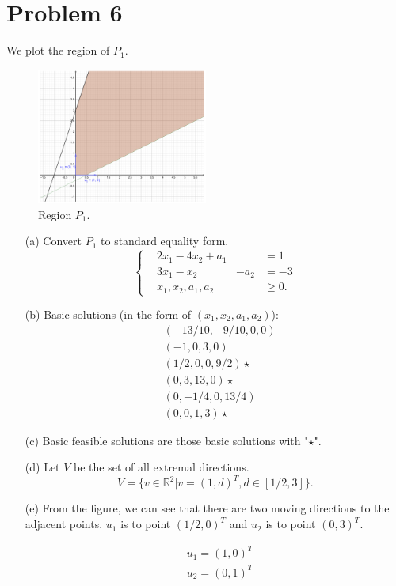 \documentclass[12pt]{article}
\begin{document}
\section*{Problem 6}
We plot the region of $P_1$.

\begin{figure}[htbp]
  \caption{Region $P_1$.}
  \centering
    \includegraphics[width=0.5\textwidth]{p6.pdf}
\end{figure}

\FloatBarrier

\begin{enumerate}
\item [(a)]
Convert $P_1$ to standard equality form.
$$
\left\{
\begin{aligned}
& 2x_1 - 4x_2 + a_1 & & = 1 \\
& 3x_1 - x_2   & -a_2 & = -3 \\
& x_1, x_2, a_1, a_2 & & \geqslant 0.
\end{aligned}
\right.
$$

\item[(b)]
Basic solutions (in the form of $(x_1, x_2, a_1, a_2)$): 
$$
\begin{aligned}
&(-13/10, -9/10, 0, 0)   \\ 
&(-1, 0, 3, 0)\\ 
&(1/2, 0, 0, 9/2) \star\\
& (0, 3, 13, 0)\star\\ 
 &(0, -1/4, 0, 13/4)\\
 & (0, 0, 1, 3)\star
\end{aligned}
$$

\item[(c)]
Basic feasible solutions are those basic solutions with "$\star$".

\item[(d)]
Let $V$ be the set of all extremal directions. 
$$
V = \{v \in\mathbb R^2| v = (1, d)^T, d\in [1/2, 3] \}.
$$

\item[(e)]
From the figure, we can see that there are two moving directions to the adjacent points. $u_1$ is to point $(1/2, 0)^T$ and $u_2$ is to point $(0, 3)^T$.

$$
\begin{aligned}
&u_1 = (1, 0)^T \\
&u_2 = (0, 1)^T 
\end{aligned}
$$
\end{enumerate}
\end{document}

